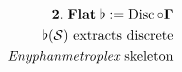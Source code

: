 \documentclass[preview]{standalone}
\begin{document}
\begin{align*}
\special{dvisvgm:raw <g id='unique000'>}\mathbf{2.\;Flat\;\flat := \operatorname{Disc}\circ\Gamma}\\\flat(\mathcal{S})\text{ extracts discrete}\\\textit{Enyphanmetroplex}\text{ skeleton}\special{dvisvgm:raw </g>}
\end{align*}
\end{document}
